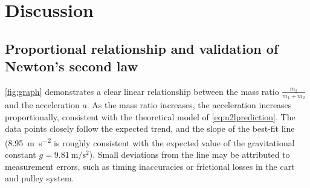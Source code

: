 ﻿\documentclass[reprint,amsmath,amssymb,aps]{revtex4-2}
\begin{document}
%
%
%
%








\section{Discussion}
\subsection{Proportional relationship and validation of Newton's second law}
\cref{fig:graph} demonstrates a clear linear relationship between the mass ratio $ \frac{m_2}{m_1 + m_2}$ and the acceleration $a$. As the mass ratio increases, the acceleration increases proportionally, consistent with the theoretical model of \cref{eq:n2lprediction}. The data points closely follow the expected trend, and the slope of the best-fit line (\qty{8.95}{\meter\per\second\squared} is roughly consistent with the expected value of the gravitational constant $g=\qty{9.81}{\meter\per\second\squared}$). Small deviations from the line may be attributed to measurement errors, such as timing inaccuracies or frictional losses in the cart and pulley system. 
\end{document}
